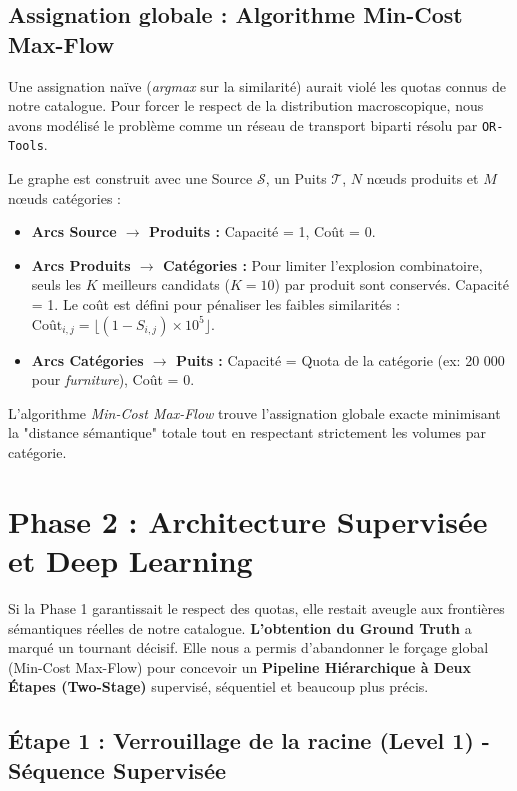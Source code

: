 \documentclass[11pt,a4paper]{article}
\begin{document}
\subsection{Assignation globale : Algorithme Min-Cost Max-Flow}
Une assignation naïve (\textit{argmax} sur la similarité) aurait violé les quotas connus de notre catalogue. Pour forcer le respect de la distribution macroscopique, nous avons modélisé le problème comme un réseau de transport biparti résolu par \texttt{OR-Tools}.


Le graphe est construit avec une Source $\mathcal{S}$, un Puits $\mathcal{T}$, $N$ nœuds produits et $M$ nœuds catégories :
\begin{itemize}
    \item \textbf{Arcs Source $\to$ Produits :} Capacité = 1, Coût = 0.
    \item \textbf{Arcs Produits $\to$ Catégories :} Pour limiter l'explosion combinatoire, seuls les $K$ meilleurs candidats ($K=10$) par produit sont conservés. Capacité = 1. Le coût est défini pour pénaliser les faibles similarités : $\text{Coût}_{i,j} = \lfloor (1 - S_{i,j}) \times 10^5 \rfloor$.
    \item \textbf{Arcs Catégories $\to$ Puits :} Capacité = Quota de la catégorie (ex: 20 000 pour \textit{furniture}), Coût = 0.
\end{itemize}
L'algorithme \textit{Min-Cost Max-Flow} trouve l'assignation globale exacte minimisant la "distance sémantique" totale tout en respectant strictement les volumes par catégorie.

\section{Phase 2 : Architecture Supervisée et Deep Learning}

Si la Phase 1 garantissait le respect des quotas, elle restait aveugle aux frontières sémantiques réelles de notre catalogue. \textbf{L'obtention du Ground Truth} a marqué un tournant décisif. Elle nous a permis d'abandonner le forçage global (Min-Cost Max-Flow) pour concevoir un \textbf{Pipeline Hiérarchique à Deux Étapes (Two-Stage)} supervisé, séquentiel et beaucoup plus précis.

\subsection{Étape 1 : Verrouillage de la racine (Level 1) - Séquence Supervisée}
\end{document}
